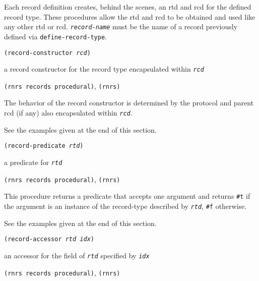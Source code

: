 Each record definition creates, behind the scenes, an rtd and rcd for the
defined record type.
These procedures allow the rtd and rcd to be obtained and used like any
other rtd or rcd.
\texttt{\textit{record-name}} must be the name of a record previously defined via
\texttt{define-record-type}.


\begin{description}

\label{records_s29}\item[procedure] \texttt{(record-constructor \textit{rcd})}



\item[returns] a record constructor for the record type encapsulated within \texttt{\textit{rcd}}


\item[libraries] \texttt{(rnrs records procedural)}, \texttt{(rnrs)}
\end{description}


The behavior of the record constructor is determined by the protocol
and parent rcd (if any) also encapsulated within \texttt{\textit{rcd}}.


See the examples given at the end of this section.


\begin{description}

\label{records_s30}\item[procedure] \texttt{(record-predicate \textit{rtd})}



\item[returns] a predicate for \texttt{\textit{rtd}}


\item[libraries] \texttt{(rnrs records procedural)}, \texttt{(rnrs)}
\end{description}


This procedure returns a predicate that accepts one argument and returns
\texttt{\#{}t} if the argument is an instance of the record-type described by
\texttt{\textit{rtd}}, \texttt{\#{}f} otherwise.


See the examples given at the end of this section.


\begin{description}

\label{records_s31}\item[procedure] \texttt{(record-accessor \textit{rtd} \textit{idx})}



\item[returns] an accessor for the field of \texttt{\textit{rtd}} specified by \texttt{\textit{idx}}


\item[libraries] \texttt{(rnrs records procedural)}, \texttt{(rnrs)}
\end{description}

